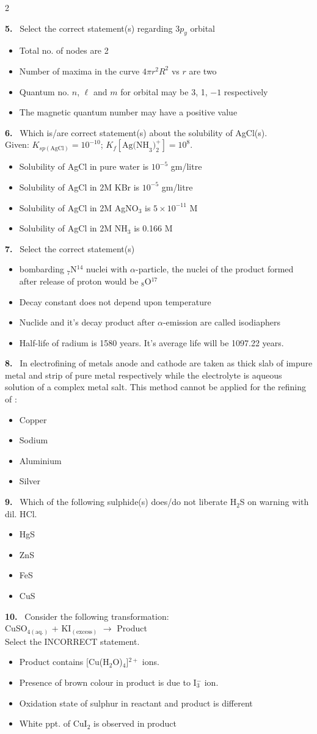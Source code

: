 \documentclass[10pt]{extarticle}
\newcommand{\qn}[1]{\par\smallskip\noindent\textbf{#1.}~}
\newenvironment{qoptions}{\begin{itemize}[leftmargin=1.8em,itemsep=1pt,topsep=2pt,label={}]}{\end{itemize}}
\newcommand{\opt}[2]{\item[(#1)] #2}
\begin{document}
\begin{multicols}{2}
\qn{5} Select the correct statement(s) regarding $3p_y$ orbital
\begin{qoptions}
\opt{A}{Total no. of nodes are 2}
\opt{B}{Number of maxima in the curve $4\pi r^2R^2$ vs $r$ are two}
\opt{C}{Quantum no. $n$, $\ell$ and $m$ for orbital may be 3, 1, $-1$ respectively}
\opt{D}{The magnetic quantum number may have a positive value}
\end{qoptions}

\qn{6} Which is/are correct statement(s) about the solubility of AgCl(s).\\ {Given: $K_{sp(\text{AgCl})}=10^{-10}$; $K_f[\text{Ag(NH}_3)_2^+]=10^8$.}
\begin{qoptions}
\opt{A}{Solubility of AgCl in pure water is $10^{-5}$ gm/litre}
\opt{B}{Solubility of AgCl in 2M KBr is $10^{-5}$ gm/litre}
\opt{C}{Solubility of AgCl in 2M AgNO$_3$ is $5\times10^{-11}$ M}
\opt{D}{Solubility of AgCl in 2M NH$_3$ is 0.166 M}
\end{qoptions}

\qn{7} Select the correct statement(s)
\begin{qoptions}
\opt{A}{bombarding ${}_7$N$^{14}$ nuclei with $\alpha$-particle, the nuclei of the product formed after release of proton would be ${}_8$O$^{17}$}
\opt{B}{Decay constant does not depend upon temperature}
\opt{C}{Nuclide and it's decay product after $\alpha$-emission are called isodiaphers}
\opt{D}{Half-life of radium is 1580 years. It's average life will be 1097.22 years.}
\end{qoptions}

\qn{8} In electrofining of metals anode and cathode are taken as thick slab of impure metal and strip of pure metal respectively while the electrolyte is aqueous solution of a complex metal salt. This method cannot be applied for the refining of :
\begin{qoptions}
\opt{A}{Copper}
\opt{B}{Sodium}
\opt{C}{Aluminium}
\opt{D}{Silver}
\end{qoptions}

\qn{9} Which of the following sulphide(s) does/do not liberate H$_2$S on warning with dil. HCl.
\begin{qoptions}
\opt{A}{HgS}
\opt{B}{ZnS}
\opt{C}{FeS}
\opt{D}{CuS}
\end{qoptions}

\qn{10} Consider the following transformation:\\
CuSO$_{4(\text{aq.})}$ + KI$_{(\text{excess})}$ $\to$ Product\\
Select the INCORRECT statement.
\begin{qoptions}
\opt{A}{Product contains [Cu(H$_2$O)$_4$]$^{2+}$ ions.}
\opt{B}{Presence of brown colour in product is due to I$_3^-$ ion.}
\opt{C}{Oxidation state of sulphur in reactant and product is different}
\opt{D}{White ppt. of CuI$_2$ is observed in product}
\end{qoptions}


\end{multicols}
\end{document}
